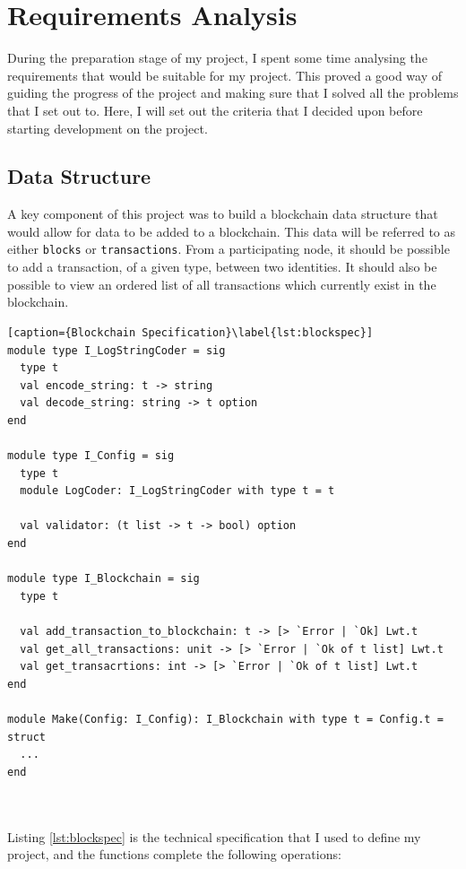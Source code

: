 \documentclass[12pt,a4paper,twoside,openright]{report}
\begin{document}
	\section{Requirements Analysis} \label{Requirements Analysis}
	During the preparation stage of my project, I spent some time analysing the requirements that would be suitable for my project. This proved a good way of guiding the progress of the project and making sure that I solved all the problems that I set out to. Here, I will set out the criteria that I decided upon before starting development on the project.
	\subsection{Data Structure}
	A key component of this project was to build a blockchain data structure that would allow for data to be added to a blockchain. 
	This data will be referred to as either \texttt{blocks} or \texttt{transactions}. 
	From a participating node, it should be possible to add a transaction, of a given type, between two identities. 
	It should also be possible to view an ordered list of all transactions which currently exist in the blockchain.
	\begin{minipage}{\linewidth}
	\begin{lstlisting}[caption={Blockchain Specification}\label{lst:blockspec}]
module type I_LogStringCoder = sig
  type t
  val encode_string: t -> string
  val decode_string: string -> t option
end

module type I_Config = sig
  type t
  module LogCoder: I_LogStringCoder with type t = t

  val validator: (t list -> t -> bool) option
end

module type I_Blockchain = sig
  type t

  val add_transaction_to_blockchain: t -> [> `Error | `Ok] Lwt.t
  val get_all_transactions: unit -> [> `Error | `Ok of t list] Lwt.t
  val get_transacrtions: int -> [> `Error | `Ok of t list] Lwt.t
end

module Make(Config: I_Config): I_Blockchain with type t = Config.t = struct 
  ...
end
	\end{lstlisting}
	\end{minipage}\\
	\\
	Listing \ref{lst:blockspec} is the technical specification that I used to define my project, and the functions complete the following operations:
\end{document}
